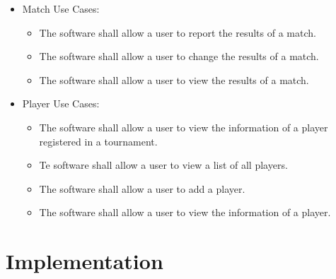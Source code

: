 \documentclass[11pt]{article}
\begin{document}
\begin{itemize}
            \item Match Use Cases:
            \begin{itemize}
                \item The software shall allow a user to report the results of a match.
                \item The software shall allow a user to change the results of a match.
                \item The software shall allow a user to view the results of a match.
            \end{itemize}

            \item Player Use Cases:
            \begin{itemize}
                \item The software shall allow a user to view the information of a player registered in a tournament.
                \item Te software shall allow a user to view a list of all players.
                \item The software shall allow a user to add a player.
                \item The software shall allow a user to view the information of a player.
            \end{itemize}
        \end{itemize}

    \newpage

    \section {Implementation}
\end{document}
